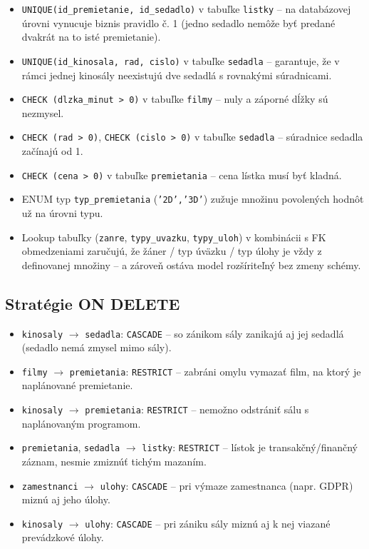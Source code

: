 \documentclass[11pt, a4paper]{article}
\begin{document}
\begin{itemize}
    \item \texttt{UNIQUE(id\_premietanie, id\_sedadlo)} v tabuľke
    \texttt{listky} -- na databázovej úrovni vynucuje biznis pravidlo č. 1
    (jedno sedadlo nemôže byť predané dvakrát na to isté premietanie).

    \item \texttt{UNIQUE(id\_kinosala, rad, cislo)} v tabuľke \texttt{sedadla}
    -- garantuje, že v rámci jednej kinosály neexistujú dve sedadlá
    s rovnakými súradnicami.

    \item \texttt{CHECK (dlzka\_minut > 0)} v tabuľke \texttt{filmy} --
    nuly a záporné dĺžky sú nezmysel.

    \item \texttt{CHECK (rad > 0)}, \texttt{CHECK (cislo > 0)} v tabuľke
    \texttt{sedadla} -- súradnice sedadla začínajú od 1.

    \item \texttt{CHECK (cena > 0)} v tabuľke \texttt{premietania} --
    cena lístka musí byť kladná.

    \item ENUM typ \texttt{typ\_premietania} (\texttt{'2D','3D'}) zužuje
    množinu povolených hodnôt už na úrovni typu.

    \item Lookup tabuľky (\texttt{zanre}, \texttt{typy\_uvazku},
    \texttt{typy\_uloh}) v kombinácii s FK obmedzeniami zaručujú, že
    žáner / typ úväzku / typ úlohy je vždy z definovanej množiny --
    a zároveň ostáva model rozšíriteľný bez zmeny schémy.
\end{itemize}

\subsection{Stratégie ON DELETE}

\begin{itemize}
    \item \texttt{kinosaly} $\rightarrow$ \texttt{sedadla}: \texttt{CASCADE}
    -- so zánikom sály zanikajú aj jej sedadlá (sedadlo nemá zmysel mimo sály).
    \item \texttt{filmy} $\rightarrow$ \texttt{premietania}: \texttt{RESTRICT}
    -- zabráni omylu vymazať film, na ktorý je naplánované premietanie.
    \item \texttt{kinosaly} $\rightarrow$ \texttt{premietania}: \texttt{RESTRICT}
    -- nemožno odstrániť sálu s naplánovaným programom.
    \item \texttt{premietania}, \texttt{sedadla} $\rightarrow$ \texttt{listky}:
    \texttt{RESTRICT} -- lístok je transakčný/finančný záznam, nesmie
    zmiznúť tichým mazaním.
    \item \texttt{zamestnanci} $\rightarrow$ \texttt{ulohy}: \texttt{CASCADE}
    -- pri výmaze zamestnanca (napr. GDPR) miznú aj jeho úlohy.
    \item \texttt{kinosaly} $\rightarrow$ \texttt{ulohy}: \texttt{CASCADE} --
    pri zániku sály miznú aj k nej viazané prevádzkové úlohy.
\end{itemize}
\end{document}
